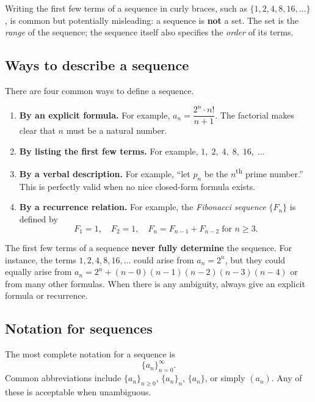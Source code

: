 \begin{remark}[Warning]
Writing the first few terms of a sequence in curly braces, such as $\{1,2,4,8,16,\dots\}$, is common but potentially misleading: a sequence is \textbf{not} a set.  The set is the \emph{range} of the sequence; the sequence itself also specifies the \emph{order} of its terms.
\end{remark}

\subsection*{Ways to describe a sequence}

There are four common ways to define a sequence.

\begin{enumerate}
  \item \textbf{By an explicit formula.}  For example, $a_{n} = \dfrac{2^{n}\cdot n!}{n+1}$.  The factorial makes clear that $n$ must be a natural number.

  \item \textbf{By listing the first few terms.}  For example, $1,\;2,\;4,\;8,\;16,\;\dots$  

  \item \textbf{By a verbal description.}  For example, ``let $p_{n}$ be the $n$\textsuperscript{th} prime number.''  This is perfectly valid when no nice closed-form formula exists.

  \item \textbf{By a recurrence relation.}  For example, the \emph{Fibonacci sequence} $\{F_{n}\}$ is defined by
  \[
    F_{1}=1,\quad F_{2}=1,\quad F_{n}=F_{n-1}+F_{n-2}\;\text{for }n\ge 3.
  \]
\end{enumerate}

\begin{remark}[Warning]
The first few terms of a sequence \textbf{never fully determine} the sequence.  For instance, the terms $1,2,4,8,16,\dots$ could arise from $a_{n}=2^{n}$, but they could equally arise from $a_{n} = 2^{n} + (n-0)(n-1)(n-2)(n-3)(n-4)$ or from many other formulas.  When there is any ambiguity, always give an explicit formula or recurrence.
\end{remark}

\subsection*{Notation for sequences}

The most complete notation for a sequence is
\[
  \{a_{n}\}_{n=0}^{\infty}.
\]
Common abbreviations include $\{a_{n}\}_{n\ge 0}$, $\{a_{n}\}_{n}$, $\{a_{n}\}$, or simply $(a_{n})$.  Any of these is acceptable when unambiguous.

